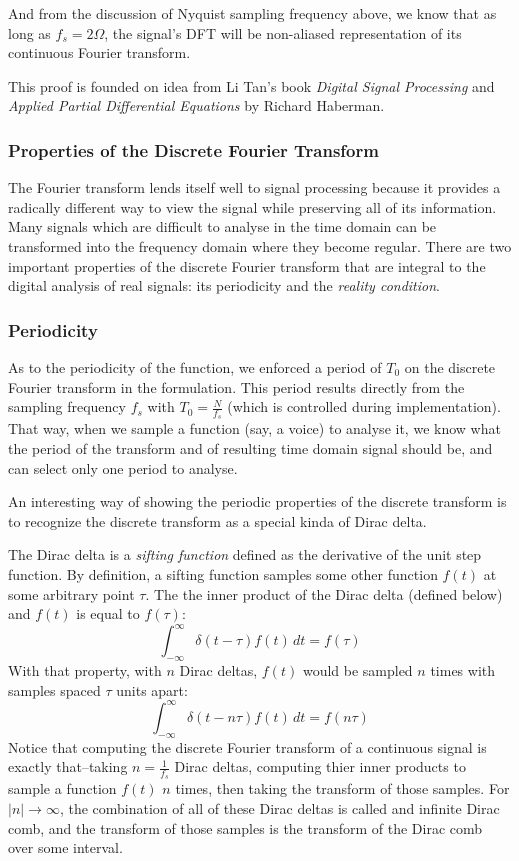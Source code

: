 \documentclass[12pt]{article}
\newcommand{\inftyint}{\int_{-\infty}^{\infty}}
\begin{document}
And from the discussion of Nyquist sampling frequency above, we know that as
long as \(f_s = 2\Omega\), the signal's DFT will be non-aliased representation
of its continuous Fourier transform.

This proof is founded on idea from Li Tan's book \emph{Digital Signal
Processing} and \emph{Applied Partial Differential Equations} by Richard
Haberman.

\subsubsection{Properties of the Discrete Fourier Transform}

The Fourier transform lends itself well to signal processing because it
provides a radically different way to view the signal while preserving all of
its information. Many signals which are difficult to analyse in the time domain
can be transformed into the frequency domain where they become regular. There
are two important properties of the discrete Fourier transform that are
integral to the digital analysis of real signals: its periodicity and the
\emph{reality condition}.

\subsubsection*{Periodicity}
As to the periodicity of the function, we enforced a period of \(T_0\) on the
discrete Fourier transform in the formulation. This period results directly
from the sampling frequency \(f_s\) with \(T_0 = \frac{N}{f_s}\) (which is
controlled during implementation). That way, when we sample a function (say, a
voice) to analyse it, we know what the period of the transform and of resulting
time domain signal should be, and can select only one period to analyse.

An interesting way of showing the periodic properties of the discrete transform
is to recognize the discrete transform as a special kinda of Dirac delta. 

The Dirac delta is a \emph{sifting function} defined as the derivative of the 
unit step function. By definition, a sifting function samples some other 
function \( f(t) \) at some arbitrary point \( \tau \). The the inner product 
of the Dirac delta (defined below) and \( f(t)\) is equal to \( f(\tau) \):
\[ \inftyint \delta(t - \tau)f(t) \, dt = f(\tau) \]
With that property, with \(n\) Dirac deltas, \( f (t) \) would be sampled
\( n\) times with samples spaced \( \tau\) units apart:
\[ \inftyint \delta(t - n\tau)f(t) \, dt = f(n\tau) \]
Notice that computing the discrete Fourier transform of a continuous 
signal is exactly that--taking \( n = \frac{1}{f_s} \) Dirac deltas, computing 
thier inner products to sample a function \( f(t) \) \(n\) times, then
taking the transform of those samples. For \( |n| \to \infty \), the 
combination of all of these Dirac deltas is called and infinite Dirac comb, 
and the transform of those samples is the transform of the Dirac comb over some
interval. 
\end{document}
